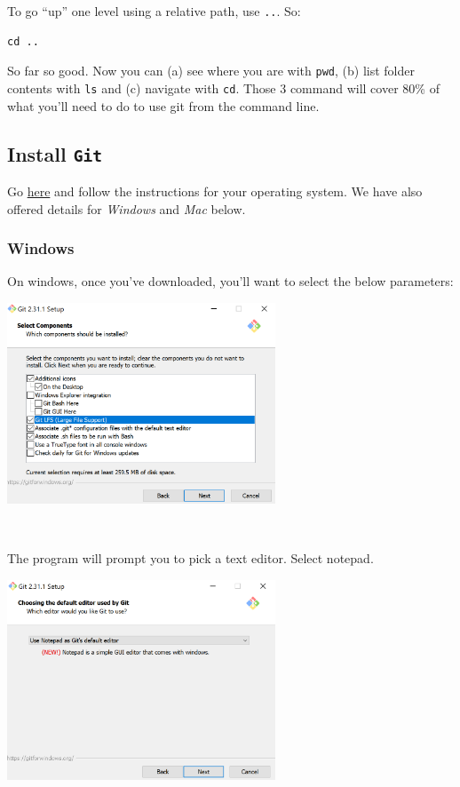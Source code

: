 \documentclass[
]{book}
\begin{document}
To go ``up'' one level using a relative path, use \texttt{..}. So:

\begin{verbatim}
cd ..
\end{verbatim}

So far so good. Now you can (a) see where you are with \texttt{pwd}, (b) list folder contents with \texttt{ls} and (c) navigate with \texttt{cd}. Those 3 command will cover 80\% of what you'll need to do to use git from the command line.

\hypertarget{install-git}{%
\subsection*{\texorpdfstring{Install \texttt{Git}}{Install Git}}\label{install-git}}

Go \href{https://git-scm.com/book/en/v2/Getting-Started-Installing-Git}{here} and follow the instructions for your operating system. We have also offered details for \emph{Windows} and \emph{Mac} below.

\hypertarget{windows}{%
\subsubsection*{Windows}\label{windows}}

On windows, once you've downloaded, you'll want to select the below parameters:

\includegraphics[width=0.6\textwidth,height=\textheight]{img/git1.png}

~

The program will prompt you to pick a text editor. Select notepad.

\includegraphics[width=0.6\textwidth,height=\textheight]{img/git2.png}
\end{document}
